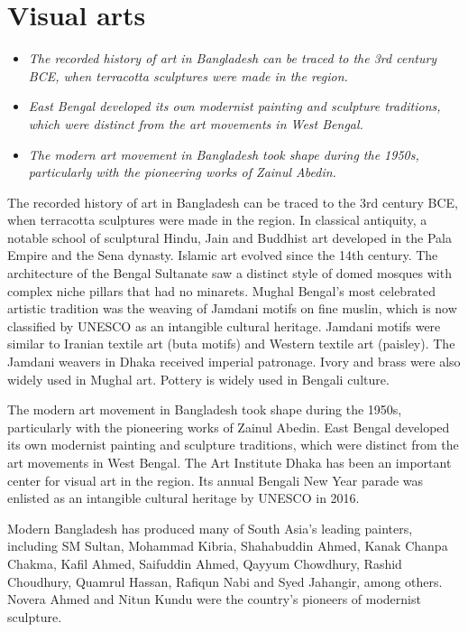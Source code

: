 \section{Visual arts}\label{visual-arts}

\begin{itemize}
\item
  \emph{The recorded history of art in Bangladesh can be traced to the
  3rd century BCE, when terracotta sculptures were made in the region.}
\item
  \emph{East Bengal developed its own modernist painting and sculpture
  traditions, which were distinct from the art movements in West
  Bengal.}
\item
  \emph{The modern art movement in Bangladesh took shape during the
  1950s, particularly with the pioneering works of Zainul Abedin.}
\end{itemize}

The recorded history of art in Bangladesh can be traced to the 3rd
century BCE, when terracotta sculptures were made in the region. In
classical antiquity, a notable school of sculptural Hindu, Jain and
Buddhist art developed in the Pala Empire and the Sena dynasty. Islamic
art evolved since the 14th century. The architecture of the Bengal
Sultanate saw a distinct style of domed mosques with complex niche
pillars that had no minarets. Mughal Bengal's most celebrated artistic
tradition was the weaving of Jamdani motifs on fine muslin, which is now
classified by UNESCO as an intangible cultural heritage. Jamdani motifs
were similar to Iranian textile art (buta motifs) and Western textile
art (paisley). The Jamdani weavers in Dhaka received imperial patronage.
Ivory and brass were also widely used in Mughal art. Pottery is widely
used in Bengali culture.

The modern art movement in Bangladesh took shape during the 1950s,
particularly with the pioneering works of Zainul Abedin. East Bengal
developed its own modernist painting and sculpture traditions, which
were distinct from the art movements in West Bengal. The Art Institute
Dhaka has been an important center for visual art in the region. Its
annual Bengali New Year parade was enlisted as an intangible cultural
heritage by UNESCO in 2016.

Modern Bangladesh has produced many of South Asia's leading painters,
including SM Sultan, Mohammad Kibria, Shahabuddin Ahmed, Kanak Chanpa
Chakma, Kafil Ahmed, Saifuddin Ahmed, Qayyum Chowdhury, Rashid
Choudhury, Quamrul Hassan, Rafiqun Nabi and Syed Jahangir, among others.
Novera Ahmed and Nitun Kundu were the country's pioneers of modernist
sculpture.

